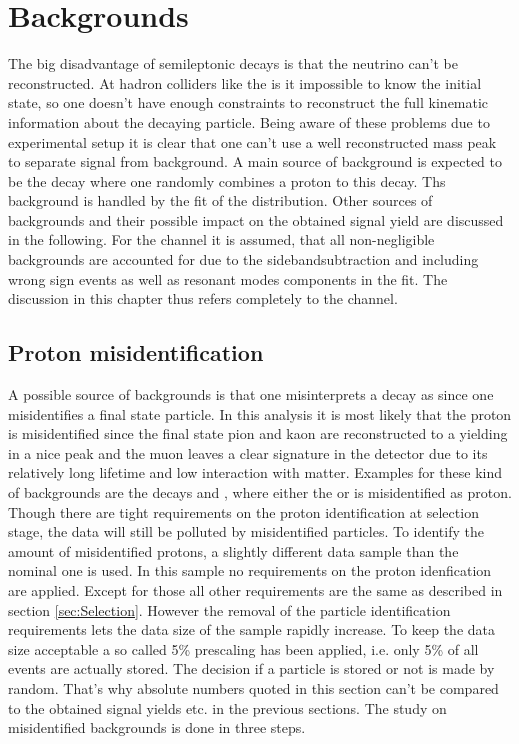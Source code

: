 \chapter{Backgrounds}
\label{sec:Backgrounds}

The big disadvantage of semileptonic decays is that the neutrino can't be reconstructed.
At hadron colliders like the \lhc is it impossible to know the initial state, so one doesn't have enough constraints to reconstruct the full kinematic information about the decaying particle.
Being aware of these problems due to experimental setup it is clear that one can't use a well reconstructed \Lb mass peak to separate signal from background.
A main source of background is expected to be the decay  where one randomly combines a proton to this decay.
Ths background is handled by the fit of the \logIP distribution.
Other sources of backgrounds and their possible impact on the obtained signal yield \NDp are discussed in the following.
For the \LbToLcmunu channel it is assumed, that all non-negligible backgrounds are accounted for due to the sidebandsubtraction and including wrong sign events as well as resonant modes components in the fit.
The discussion in this chapter thus refers completely to the \LbToDpmunuX channel.

\section{Proton misidentification}
\label{sec:BKG_misIDp}
A possible source of backgrounds is that one misinterprets a decay as \LbToDpmunuX since one misidentifies a final state particle.
In this analysis it is most likely that the proton is misidentified since the final state pion and kaon are reconstructed to a \Dz yielding in a nice peak and the muon leaves a clear signature in the detector due to its relatively long lifetime and low interaction with matter.
Examples for these kind of backgrounds are the decays  and , where either the \Kp or \pip is misidentified as proton.
Though there are tight requirements on the proton identification at selection stage, the data will still be polluted by misidentified particles.
To identify the amount of misidentified protons, a slightly different data sample than the nominal one is used. 
In this sample no requirements on the proton idenfication are applied.
Except for those all other requirements are the same as described in section \ref{sec:Selection}.
However the removal of the particle identification requirements lets the data size of the sample rapidly increase.
To keep the data size acceptable a so called 5\% prescaling has been applied, i.e. only 5\% of all events are actually stored.
The decision if a particle is stored or not is made by random.
That's why absolute numbers quoted in this section can't be compared to the obtained signal yields etc. in the previous sections.
The study on misidentified backgrounds is done in three steps.

